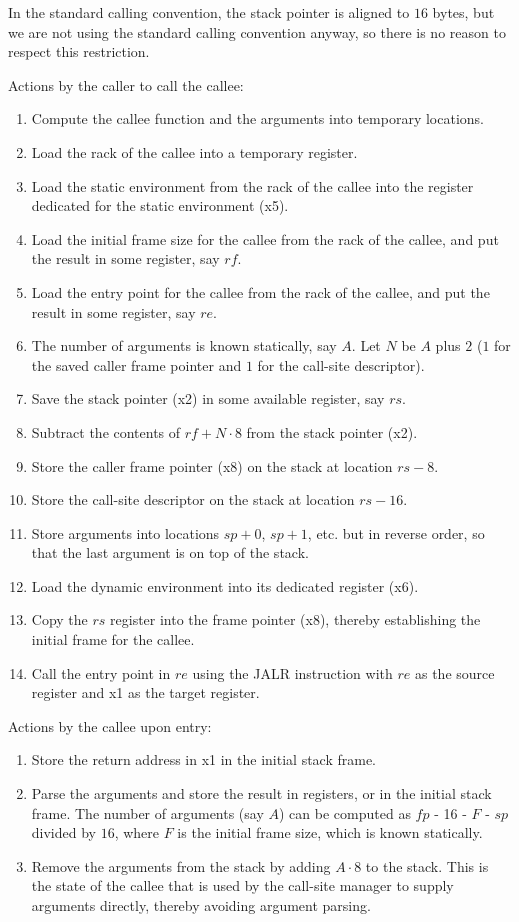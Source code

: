 In the standard \riscv{} calling convention, the stack pointer is
aligned to $16$ bytes, but we are not using the standard \riscv{}
calling convention anyway, so there is no reason to respect this
restriction.

Actions by the caller to call the callee:

\begin{enumerate}
\item Compute the callee function and the arguments into temporary
  locations.
\item Load the rack of the callee into a temporary register.
\item Load the static environment from the rack of the callee into the
  register dedicated for the static environment (x5).
\item Load the initial frame size for the callee from the rack of the
  callee, and put the result in some register, say $rf$.
\item Load the entry point for the callee from the rack of the callee,
  and put the result in some register, say $re$.
\item The number of arguments is known statically, say $A$.  Let $N$
  be $A$ plus $2$ ($1$ for the saved caller frame pointer and $1$ for
  the call-site descriptor).
\item Save the stack pointer (x2) in some available register, say $rs$.
\item Subtract the contents of $rf + N \cdot 8$ from the stack
  pointer (x2).
\item Store the caller frame pointer (x8) on the stack at location $rs
  - 8$.
\item Store the call-site descriptor on the stack at location $rs -
  16$.
\item Store arguments into locations $sp +  0$, $sp +  1$, etc. but in
  reverse order, so that the last argument is on top of the stack.
\item Load the dynamic environment into its dedicated register (x6).
\item Copy the $rs$ register into the frame pointer (x8), thereby
  establishing the initial frame for the callee.
\item Call the entry point in $re$ using the JALR instruction with
  $re$ as the source register and x1 as the target register.
\end{enumerate}

Actions by the callee upon entry:

\begin{enumerate}
\item Store the return address in x1 in the initial stack frame.
\item Parse the arguments and store the result in registers, or in the
  initial stack frame. The number of arguments (say $A$) can be
  computed as $fp$ - 16 - $F$ - $sp$ divided by $16$, where $F$ is the
  initial frame size, which is known statically.
\item Remove the arguments from the stack by adding $A \cdot 8$ to the
  stack.  This is the state of the callee that is used by the
  call-site manager to supply arguments directly, thereby avoiding
  argument parsing. 
\end{enumerate}

